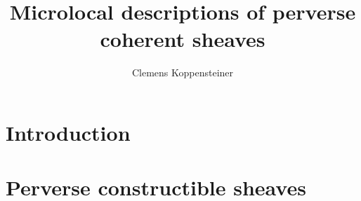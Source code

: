 \documentclass[english]{thesis}
\title{Microlocal descriptions of perverse coherent sheaves}
\author{Clemens Koppensteiner}
\begin{document}
\frontmatter

\maketitlepage

\tableofcontents

\mainmatter

\chapter{Introduction}





\chapter{Perverse constructible sheaves}

\backmatter

\printbibliography
\end{document}
